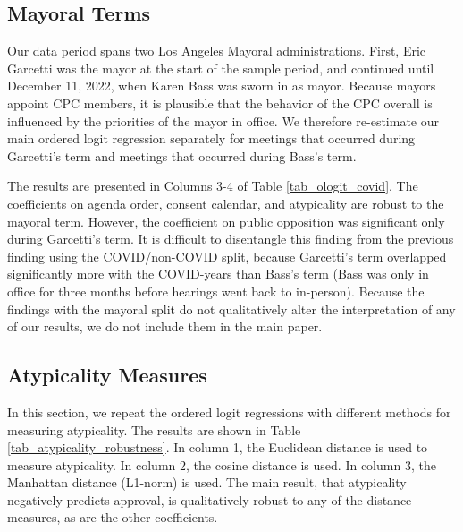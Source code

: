 \subsection{Mayoral Terms}

Our data period spans two Los Angeles Mayoral administrations. First, Eric Garcetti was the mayor at the start of the sample period, and continued until December 11, 2022, when Karen Bass was sworn in as mayor. Because mayors appoint CPC members, it is plausible that the behavior of the CPC overall is influenced by the priorities of the mayor in office. We therefore re-estimate our main ordered logit regression separately for meetings that occurred during Garcetti's term and meetings that occurred during Bass's term. 

The results are presented in Columns 3-4 of Table \ref{tab_ologit_covid}. The coefficients on agenda order, consent calendar, and atypicality are robust to the mayoral term. However, the coefficient on public opposition was significant only during Garcetti's term. It is difficult to disentangle this finding from the previous finding using the COVID/non-COVID split, because Garcetti's term overlapped significantly more with the COVID-years than Bass's term (Bass was only in office for three months before hearings went back to in-person). Because the findings with the mayoral split do not qualitatively alter the interpretation of any of our results, we do not include them in the main paper.

\subsection{Atypicality Measures}

In this section, we repeat the ordered logit regressions with different methods for measuring atypicality. The results are shown in Table \ref{tab_atypicality_robustness}. In column 1, the Euclidean distance is used to measure atypicality. In column 2, the cosine distance is used. In column 3, the Manhattan distance (L1-norm) is used. The main result, that atypicality negatively predicts approval, is qualitatively robust to any of the distance measures, as are the other coefficients.

